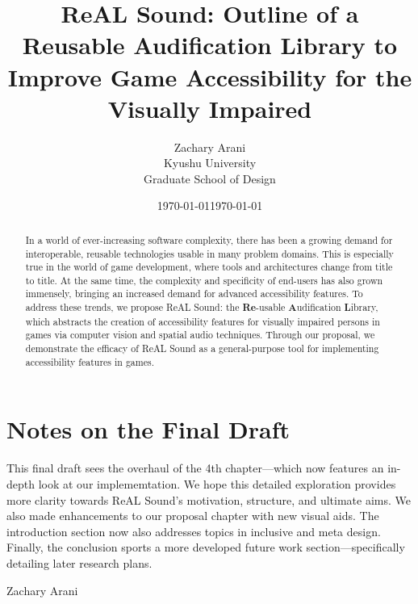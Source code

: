 \documentclass{report}
\newcommand{\rs}{ReAL Sound\xspace}
\newcommand{\rsfull}{\textbf{Re}-usable \textbf{A}udification \textbf{L}ibrary\xspace}
\begin{document}

\author{Zachary Arani \\ Kyushu University \\ Graduate School of Design} %
\title{ReAL Sound: Outline of a Reusable Audification Library to Improve Game Accessibility for the Visually Impaired} 
\date{\today{}} 
\maketitle{} 


\begin{abstract}
    In a world of ever-increasing software complexity, there has been a growing demand for interoperable, reusable technologies usable in many problem domains. This is especially true in the world of game development, where tools and architectures change from title to title. At the same time, the complexity and specificity of end-users has also grown immensely, bringing an increased demand for advanced accessibility features. To address these trends, we propose \rs: the \rsfull, which abstracts the creation of accessibility features for visually impaired persons in games via computer vision and spatial audio techniques. Through our proposal, we demonstrate the efficacy of \rs as a general-purpose tool for implementing accessibility features in games.  
\end{abstract}

\newpage{} %


\chapter*{Notes on the Final Draft}
This final draft sees the overhaul of the 4th chapter---which now features an in-depth look at our implememtation. We hope this detailed exploration provides more clarity towards \rs's motivation, structure, and ultimate aims. We also made enhancements to our proposal chapter with new visual aids. The introduction section now also addresses topics in inclusive and meta design. Finally, the conclusion sports a more developed future work section---specifically detailing later research plans. 

\begin{flushright}
\vspace{5mm}
Zachary Arani
\\
\date{\today}
\end{flushright}
\end{document}

